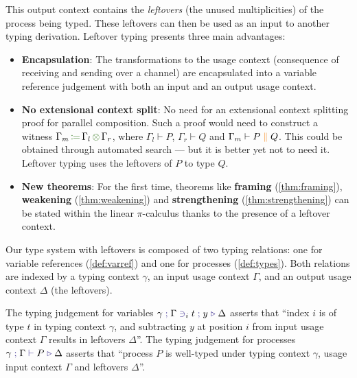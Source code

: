\documentclass[a4paper,UKenglish,cleveref,autoref,thm-restate,authorcolumns]{lipics-v2019}
\theoremstyle{definition}
\newcommand{\picalc}{$\pi$-calculus}
\newcommand{\type}[1]{\textcolor{BlueViolet}{\operatorname{#1}}}
\newcommand{\constr}[1]{\textcolor{BurntOrange}{\operatorname{#1}}}
\newcommand{\func}[1]{\textcolor{OliveGreen}{\operatorname{#1}}}
\newcommand{\comp}[2]{#1 \; \constr{\parallel} \; #2}
\newcommand{\opctx}[3]{#1 \, \func{\coloneqq} \, #2 \, \func{\otimes} \, #3}
\newcommand{\types}[4]{#1 \; \type{;} \; #2 \; \type{\vdash} \; #3 \; \type{\triangleright} \; #4}
\newcommand{\contains}[6]{#1 \; \type{;} \; #2 \; \type{\ni}_{#3} \; #4 \; \type{;} \; #5 \; \type{\triangleright} \; #6}
\begin{document}
This output context contains the \emph{leftovers} (the unused multiplicities) of the process being typed.
These leftovers can then be used as an input to another typing derivation.
Leftover typing presents three main advantages:
\begin{itemize}
  \item \textbf{Encapsulation}:
    The transformations to the usage context (consequence of receiving and sending over a channel) are encapsulated into a variable reference judgement with both an input and an output usage context.
  \item \textbf{No extensional context split}:
    No need for an extensional context splitting proof for parallel composition.
    Such a proof would need to construct a witness $\opctx{\Gamma_m}{\Gamma_l}{\Gamma_r}$, where $\Gamma_l \vdash P$, $\Gamma_r \vdash Q$ and $\Gamma_m \vdash \comp{P}{Q}$.
    This could be obtained through automated search --- but it is better yet not to need it.
    Leftover typing uses the leftovers of $P$ to type $Q$.
  \item \textbf{New theorems}:
    For the first time, theorems like \textbf{framing} (\autoref{thm:framing}), \textbf{weakening} (\autoref{thm:weakening}) and \textbf{strengthening} (\autoref{thm:strengthening}) can be stated within the linear \picalc{} thanks to the presence of a leftover context.
\end{itemize}

Our type system with leftovers is composed of two typing relations: one for variable references (\autoref{def:varref}) and one for processes (\autoref{def:types}).
Both relations are indexed by a typing context $\gamma$, an input usage context $\Gamma$, and an output usage context $\Delta$ (the leftovers).

The typing judgement for variables $\contains{\gamma}{\Gamma}{i}{t}{y}{\Delta}$ asserts that ``index $i$ is of type $t$ in typing context $\gamma$, and subtracting $y$ at position $i$ from input usage context $\Gamma$ results in leftovers $\Delta$''.
The typing judgement for processes $\types{\gamma}{\Gamma}{P}{\Delta}$ asserts that ``process $P$ is well-typed under typing context $\gamma$, usage input context $\Gamma$ and leftovers $\Delta$''.
\end{document}
